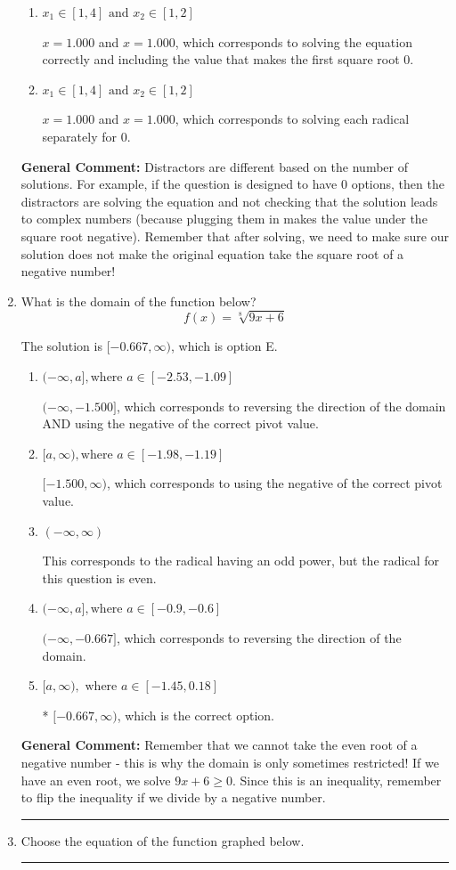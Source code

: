 \documentclass{extbook}[14pt]
\newcommand{\litem}[1]{\item #1

\rule{\textwidth}{0.4pt}}
\begin{document}
\begin{enumerate}
{\begin{enumerate}[label=\Alph*.]
* $x = 1.000$, which is the correct option.
\item \( x_1 \in [1, 4] \text{ and } x_2 \in [1,2] \)

$x = 1.000$ and $x = 1.000$, which corresponds to solving the equation correctly and including the value that makes the first square root 0.
\item \( x_1 \in [1, 4] \text{ and } x_2 \in [1,2] \)

$x = 1.000$ and $x = 1.000$, which corresponds to solving each radical separately for 0.
\end{enumerate}

\textbf{General Comment:} Distractors are different based on the number of solutions. For example, if the question is designed to have 0 options, then the distractors are solving the equation and not checking that the solution leads to complex numbers (because plugging them in makes the value under the square root negative). Remember that after solving, we need to make sure our solution does not make the original equation take the square root of a negative number!
}
\litem{
What is the domain of the function below?
\[ f(x) = \sqrt[8]{9 x + 6} \]

The solution is \( [-0.667, \infty) \), which is option E.\begin{enumerate}[label=\Alph*.]
\item \( (-\infty, a], \text{where } a \in [-2.53, -1.09] \)

$(-\infty, -1.500]$, which corresponds to reversing the direction of the domain AND using the negative of the correct pivot value.
\item \( [a, \infty), \text{where } a \in [-1.98, -1.19] \)

$[-1.500, \infty)$, which corresponds to using the negative of the correct pivot value.
\item \( (-\infty, \infty) \)

This corresponds to the radical having an odd power, but the radical for this question is even.
\item \( (-\infty, a], \text{where } a \in [-0.9, -0.6] \)

 $(-\infty, -0.667]$, which corresponds to reversing the direction of the domain.
\item \( [a, \infty), \text{ where } a \in [-1.45, 0.18] \)

* $[-0.667, \infty)$, which is the correct option.
\end{enumerate}

\textbf{General Comment:} Remember that we cannot take the even root of a negative number - this is why the domain is only sometimes restricted! If we have an even root, we solve $9 x + 6 \geq 0$. Since this is an inequality, remember to flip the inequality if we divide by a negative number.
}
\litem{
Choose the equation of the function graphed below.

}
\end{enumerate}
\end{document}
